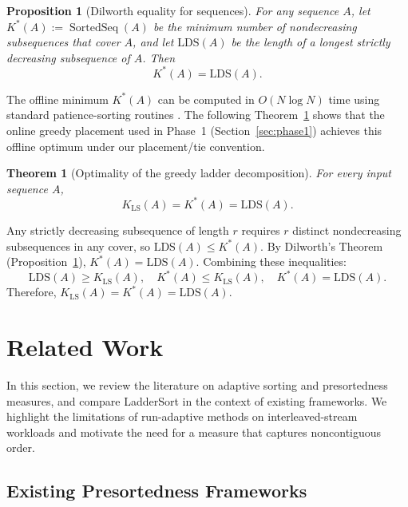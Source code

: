 \documentclass{ieeeaccess}
\theoremstyle{plain}
\newtheorem{theorem}{Theorem}[section]
\newtheorem{proposition}{Proposition}[section]
\theoremstyle{definition}
\DeclareMathOperator{\SortedSeq}{SortedSeq}
\begin{document}
\begin{proposition}[Dilworth equality for sequences]
\label{prop:dilworth}
For any sequence $A$, let $K^*(A) := \SortedSeq(A)$ be the minimum number
of nondecreasing subsequences that cover $A$, and let $\mathrm{LDS}(A)$ be
the length of a longest strictly decreasing subsequence of $A$.  Then
\[ K^*(A) = \mathrm{LDS}(A). \]
\end{proposition}

The offline minimum $K^*(A)$ can be computed in $O(N\log N)$ time using standard patience-sorting routines \cite{Fredman1975,AldousDiaconis1999}. The following Theorem~\ref{thm:greedy_optimal} shows that the online greedy placement used in
Phase~1 (Section~\ref{sec:phase1}) achieves this offline optimum under our placement/tie convention.

\begin{theorem}[Optimality of the greedy ladder decomposition]
\label{thm:greedy_optimal}
For every input sequence $A$,
\[ K_{\mathrm{LS}}(A) = K^*(A) = \mathrm{LDS}(A). \]
\end{theorem}

Any strictly decreasing subsequence of length $r$ requires $r$ distinct nondecreasing subsequences in any cover, so $\mathrm{LDS}(A) \le K^*(A)$.
By Dilworth's Theorem (Proposition~\ref{prop:dilworth}), $K^*(A) = \mathrm{LDS}(A)$. Combining these inequalities:
\[ \mathrm{LDS}(A) \ge K_{\mathrm{LS}}(A), \quad K^*(A) \le K_{\mathrm{LS}}(A), \quad K^*(A) = \mathrm{LDS}(A). \]
Therefore, $K_{\mathrm{LS}}(A) = K^*(A) = \mathrm{LDS}(A)$.


\section{Related Work}
\label{sec:related}

In this section, we review the literature on adaptive sorting and presortedness measures, and compare LadderSort in the context of existing frameworks. We highlight the limitations of run-adaptive methods on interleaved-stream workloads and motivate the need for a measure that captures noncontiguous order.

\subsection{Existing Presortedness Frameworks}
\label{sec:measures}
\end{document}
